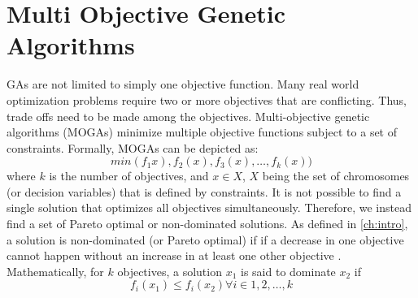 \section{Multi Objective Genetic Algorithms}
GAs are not limited to simply one objective function. Many real world optimization problems require two or more objectives that are conflicting. Thus, trade offs need to be made among the objectives. Multi-objective genetic algorithms (MOGAs) minimize multiple objective functions subject to a set of constraints. Formally, MOGAs can be depicted as: 
\begin{equation}
min(f_1x), f_2(x), f_3(x), \ldots,f_k(x))
\end{equation}
where $k$ is the number of objectives, and $x \in X$, $X$ being the set of chromosomes (or decision variables) that is defined by constraints. It is not possible to find a single solution that optimizes all objectives simultaneously. Therefore, we instead find a set of Pareto optimal or non-dominated solutions. As defined in \ref{ch:intro}, a solution is non-dominated (or Pareto optimal) if if a decrease in one objective cannot happen without an increase in at least one other objective \cite{Deb2002}\cite{Pernodet2009}. Mathematically, for $k$ objectives, a solution $x_1$ is said to dominate $x_2$ if
    \begin{equation}
        f_i(x_1) \leq f_i(x_2) \forall i \in {1,2,\ldots,k}
    \end{equation}

